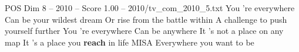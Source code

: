\begin{textsample}{POS Dim 8 – 2010 – Score 1.00 – 2010/tv\_com\_2010\_5.txt}  \label{ex:f8_pos_052}
You 're everywhere Can be your wildest dream Or rise from the battle within A challenge to push yourself further You 're everywhere Can be anywhere It 's not a place on any map It 's a place you \textbf{reach} in life MISA Everywhere you want to be

\end{textsample}
